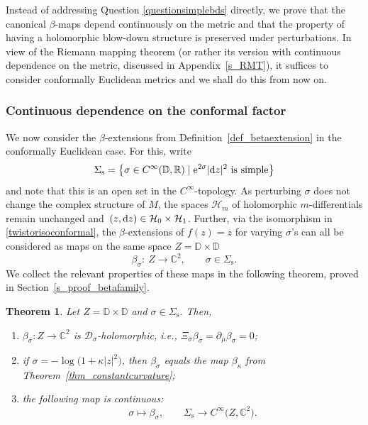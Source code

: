\documentclass[10pt,a4paper]{amsart}
\numberwithin{equation}{section}
\newtheorem{Theorem}{Theorem}[section]
\theoremstyle{definition}
\newcommand{\R}{\mathbb{R}} %
\newcommand{\C}{\mathbb{C}} %
\newcommand{\DD}{\mathbb{D}} %
\newcommand{\1}{{\bf 1}}
\newcommand{\D}{\mathscr{D}}
\begin{document}
Instead of addressing Question \ref{questionsimplebds} directly, we prove that the canonical $\beta$-maps depend continuously on the metric and that the property of having a holomorphic blow-down structure is preserved under perturbations. In view of the Riemann mapping theorem (or rather its version with continuous dependence on the metric, discussed in Appendix~\ref{s_RMT}), it suffices to consider conformally Euclidean metrics and we shall do this from now on.

\subsubsection{Continuous dependence on the conformal factor} We now consider the $\beta$-extensions from Definition~\ref{def_betaextension} in the conformally Euclidean case. For this, write
\[
	\Sigma_\mathrm{s} =\big\{\sigma \in C^\infty(\DD,\R)\mid {\rm e}^{2\sigma}|{\rm d}z|^2 \text{ is simple} \big\}
\]
and note that this is an open set in the $C^\infty$-topology.
As perturbing $\sigma$ does not change the complex structure of $M$, the spaces $\mathcal H_m$ of holomorphic $m$-differentials remain unchanged and~${(z,{\rm d}z)\in \mathcal H_0\times \mathcal H_1}$. Further, via the isomorphism in \eqref{twistorisoconformal}, the $\beta$-extensions of $f(z)= z$ for varying $\sigma$'s can all be considered as maps on the same space $Z=\DD\times \DD$
\[
	\beta_\sigma \colon\ Z \rightarrow \C^2,\qquad \sigma\in \Sigma_{\mathrm{s}}.
\]
We collect the relevant properties of these maps in the following theorem, proved in Section~\ref{s_proof_betafamily}.


\begin{Theorem} \label{thm_betafamily}
Let $Z=\DD\times \DD$ and $\sigma \in \Sigma_\mathrm{s}$. Then,
\begin{enumerate}[label=\rm(\roman*)]\itemsep=0pt
	\item \label{betafamily1} $\beta_\sigma\colon Z\rightarrow \C^2$ is $\D_\sigma$-holomorphic, i.e., $\Xi_\sigma \beta_\sigma= \partial_{\bar \mu} \beta_{\sigma}=0$;
	
	\item \label{betafamily2} if $\sigma=-\log\bigl(1+\kappa|z|^2\bigr)$, then $\beta_\sigma$ equals the map $\beta_\kappa$ from Theorem~{\rm\ref{thm_constantcurvature}};
	
	\item \label{betafamily3}the following map is continuous:
	\[
		\sigma\mapsto \beta_\sigma,\qquad \Sigma_\mathrm{s}\rightarrow C^\infty\bigl(Z,\C^2\bigr).
	\]
\end{enumerate}
\end{Theorem}
\end{document}

